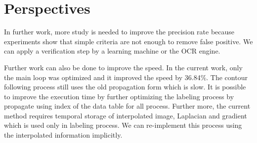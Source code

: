 \section{Perspectives}

In further work, more study is needed to improve the precision rate because experiments show that simple criteria are not enough to remove false positive. We can apply a verification step by a learning machine or the OCR engine. 

Further work can also be done to improve the speed. In the current work, only the main loop was optimized and it improved the speed by 36.84\%. The contour following process still uses the old propagation form which is slow. It is possible to improve the execution time by further optimizing the labeling process by propagate using index of the data table for all process. Further more, the current method requires temporal storage of interpolated image, Laplacian and gradient which is used only in labeling process. We can re-implement this process using the interpolated information implicitly.

